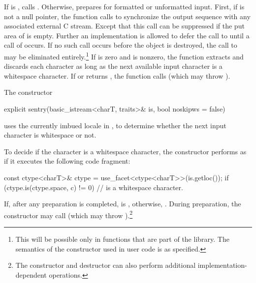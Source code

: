 \begin{itemdescr}
\pnum
\effects
If
is
,
calls . Otherwise,
prepares for formatted or
unformatted input.
First, if
is not a null pointer, the
function calls
%
to synchronize the output sequence with any associated external
C stream.
Except that this call can be suppressed if the put area of
is empty.
Further an implementation is allowed to defer the call to
until a
call of
occurs.
If no such call occurs before the
object is destroyed, the call to
may be eliminated entirely.\footnote{This will be possible only in functions
that are part of the library.
The semantics of the constructor used in user code is as specified.}
If  is zero and
is nonzero, the function extracts and discards each character as long as
the next available input character  is a whitespace character.
If
or
returns
,
the function calls
(which may throw
).

\pnum
\remarks
The constructor
\begin{codeblock}
explicit sentry(basic_istream<charT, traits>& is, bool noskipws = false)
\end{codeblock}
uses the currently imbued locale in ,
to determine whether the next input character is
whitespace or not.

\pnum
To decide if the character  is a whitespace character,
the constructor performs as if it executes the following code fragment:
\begin{codeblock}
const ctype<charT>& ctype = use_facet<ctype<charT>>(is.getloc());
if (ctype.is(ctype.space, c) != 0)
  //  is a whitespace character.
\end{codeblock}

\pnum
If, after any preparation is completed,
is
,
otherwise,
.
During preparation, the constructor may call
(which may throw
).\footnote{The
constructor and destructor
can also perform additional
%
implementation-dependent operations.}
\end{itemdescr}

